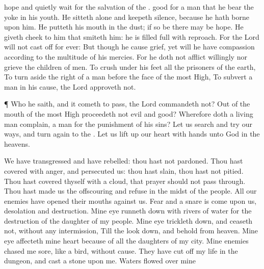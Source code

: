 {hope and quietly
wait for the
salvation of the
{}.
good for a
man that he
bear the
yoke in his
youth.
He
sitteth
alone and keepeth
silence, because he hath
borne
{} upon him.
He
putteth his
mouth in the
dust; if so be there may
be
hope.
He
giveth
{}
cheek to him that
smiteth him: he is filled
full with
reproach.
For the
Lord will not cast
off for
ever:
But though he cause
grief, yet will he have
compassion according to the
multitude of his
mercies.
For he doth not
afflict
willingly nor
grieve the
children of
men.
To
crush under his
feet all the
prisoners of the
earth,
To turn
aside the
right of a
man before the
face of the most
High,
To
subvert a
man in his
cause, the
Lord
approveth not.
\par }{\PP {}¶ Who
{} he
{}
saith, and it cometh to pass,
{} the
Lord
commandeth
{} not?
Out of the
mouth of the most
High
proceedeth not
evil and
good?
Wherefore doth a
living
man
complain, a
man for the punishment of his
sins?
Let us
search and
try our
ways, and turn
again to the
{}.
Let us lift
up our
heart with
{}
hands unto
God in the
heavens.
\par }{\PP {}We have
transgressed and have
rebelled: thou hast not
pardoned.
Thou hast
covered with
anger, and
persecuted us: thou hast
slain, thou hast not
pitied.
Thou hast
covered thyself with a
cloud, that
{}
prayer should not pass
through.
Thou hast
made us
{} the
offscouring and
refuse in the
midst of the
people.
All our
enemies have
opened their
mouths against us.
Fear and a
snare is come upon us,
desolation and
destruction.
Mine
eye runneth
down with
rivers of
water for the
destruction of the
daughter of my
people.
Mine
eye trickleth
down, and
ceaseth not, without any
intermission,
Till the
{} look
down, and
behold from
heaven.
Mine
eye
affecteth mine
heart because of all the
daughters of my
city.
Mine
enemies
chased me
sore, like a
bird, without
cause.
They have cut
off my
life in the
dungeon, and
cast a
stone upon me.
Waters flowed
over mine
}
